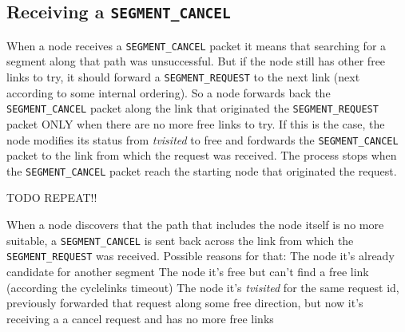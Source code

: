 \subsection{Receiving a \texttt{SEGMENT\_CANCEL}}
When a node receives a \texttt{SEGMENT\_CANCEL} packet it means that searching
for a segment along that path was unsuccessful. But if the node still
has other free links to try, it should forward a \texttt{SEGMENT\_REQUEST} to
the next link (next according to some internal ordering). So a node
forwards back the \texttt{SEGMENT\_CANCEL} packet along the link that originated
the \texttt{SEGMENT\_REQUEST} packet ONLY when there are no more free links to
try. If this is the case, the node modifies its status from \emph{tvisited}
to free and fordwards the \texttt{SEGMENT\_CANCEL} packet to the link from which
the request was received. The process stops when the \texttt{SEGMENT\_CANCEL}
packet reach the starting node that originated the request.

TODO REPEAT!!

When a node discovers that the path that includes
the node itself is no more suitable, a \texttt{SEGMENT\_CANCEL} is sent back
across the link from which the \texttt{SEGMENT\_REQUEST} was received.  Possible
reasons for that: The node it’s already candidate for another segment
The node it’s free but can’t find a free link (according the
cyclelinks timeout) The node it’s \emph{tvisited} for the same request id,
previously forwarded that request along some free direction, but now
it’s receiving a a cancel request and has no more free links
